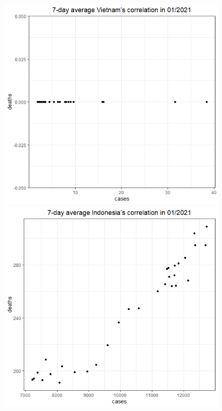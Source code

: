 \documentclass[a4paper]{article}
\theoremstyle{definition}
\begin{document}
\begin{enumerate}[1)]
\begin{figure}[H]
\begin{center}
        \includegraphics[scale = 0.3]{ix/ix.3/VN_01_2021.png}
        \includegraphics[scale = 0.3]{ix/ix.3/IDN_01_2021.png}

\end{center}
\end{figure}
\end{enumerate}
\end{document}
